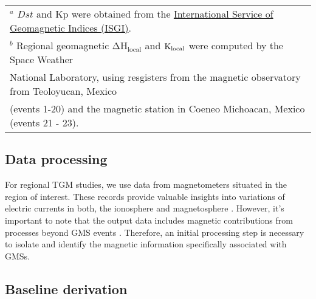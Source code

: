 \documentclass[12pt]{article}
\begin{document}
\begin{table*}[h!]
\begin{tabular}{cccccc}
		\multicolumn{6}{l}{$^a$ $Dst$ and Kp were obtained from the \href{http://isgi.unistra.fr/data_download.php}{International Service of Geomagnetic Indices (ISGI)}.}\\
		\multicolumn{6}{l}{$^b$ Regional geomagnetic $\mathrm{\Delta H_{local}}$ and ${\rm K_{local}}$ were computed by the Space Weather } \\
		\multicolumn{6}{l}{National Laboratory, using resgisters from the magnetic observatory from Teoloyucan, Mexico }\\ 
		\multicolumn{6}{l}{(events 1-20) and the magnetic station in Coeneo Michoacan, Mexico (events 21 - 23).} \end{tabular}
\end{table*}


\subsection{Data processing}
\label{SS:2-2}
For regional TGM studies, we use data from magnetometers situated in the region of interest. These records provide valuable insights into variations of electric currents in both, the ionosphere and magnetosphere \citep{BARTELS_kp}. However, it's important to note that the output data includes magnetic contributions from processes beyond GMS events \citep{amorymazaudier_2017, amory2020_filtros}. Therefore, an initial processing step is necessary to isolate and identify the magnetic information specifically associated with GMSs.

\subsection{Baseline derivation}
\end{document}
